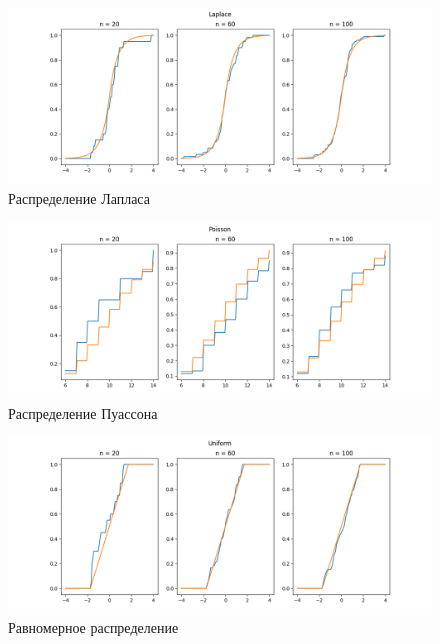 \documentclass[12pt]{article}
\begin{document}
\begin{figure}[h!]
  \centering
  \includegraphics[width=0.8\paperwidth ]{../images/edf/Laplace.png}
  \caption{Распределение Лапласа}
\end{figure}

\begin{figure}[h!]
  \centering
  \includegraphics[width=0.8\paperwidth ]{../images/edf/Poisson.png}
  \caption{Распределение Пуассона}
\end{figure}

\begin{figure}[h!]
  \centering
  \includegraphics[width=0.8\paperwidth ]{../images/edf/Uniform.png}
  \caption{Равномерное распределение}
\end{figure}

\FloatBarrier
\end{document}
